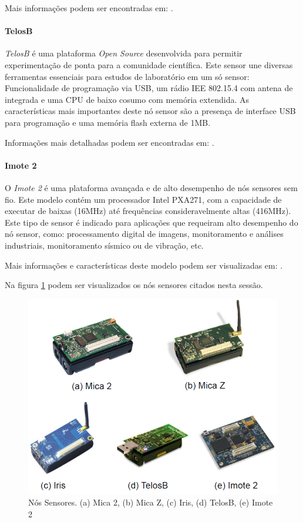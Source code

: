 Mais informações podem ser encontradas em: \cite{Iris}.

\paragraph{TelosB}
\emph{TelosB} é uma plataforma \emph{Open Source} desenvolvida para permitir experimentação de ponta para a comunidade científica. Este sensor une diversas ferramentas essenciais para estudos de laboratório em um só sensor: Funcionalidade de programação via USB, um rádio IEE 802.15.4 com antena de integrada e uma CPU de baixo cosumo com memória extendida.
As características mais importantes deste nó sensor são a presença de interface USB para programação e uma memória flash externa de 1MB.

Informações mais detalhadas podem ser encontradas em: \cite{TelosB}.

\paragraph{Imote 2}
O \emph{Imote 2} é uma plataforma avançada e de alto desempenho de nós sensores sem fio. Este modelo contém um processador Intel PXA271, com a capacidade de executar de baixas (16MHz) até frequências consideravelmente altas (416MHz).
Este tipo de sensor é indicado para aplicações que requeiram alto desempenho do nó sensor, como: processamento digital de imagens, monitoramento e análises industriais, monitoramento sísmico ou de vibração, etc.

Mais informações e características deste modelo podem ser visualizadas em: \cite{Imote}.


Na figura \ref{fig:nodes} podem ser visualizados os nós sensores citados nesta sessão.

\begin{figure}[h!]
\centering
\includegraphics[width=12cm]{pictures/sensor_nodes.png}
\caption{Nós Sensores. (a) Mica 2, (b) Mica Z, (c) Iris, (d) TelosB, (e) Imote 2}
 \label{fig:nodes}
\end{figure}